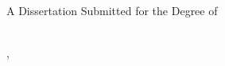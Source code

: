 \begin{titlepage}
    \begin{center}
        \begingroup
        \vspace*{2mm}
				\large \thesisType\\
        \vspace{2mm}
				\large \jpn{\thesisTypeJP}
        \endgroup

        \vfill

        \begingroup
				\Large \myTitle\\
        \vspace{2mm}
				\Large \jpn{(\myTitleJP)}
        \endgroup

        \vfill
        \vfill

        \begingroup
				\large A Dissertation Submitted for the Degree of {\myDegree}\\
				\large {\myTime}\\
        \vspace{2mm}
				\large {}
        \endgroup

        \vfill

        \begingroup
        \large \myDepartment, \myFaculty \\
        \myUni \\
        \vspace{2mm}
				\large \jpn{\myDepFacUniJP}
        \endgroup

        \vfill

        \begingroup
        \large \myName\\
        \vspace{2mm}
				\large \jpn{\myNameJP}
        \vspace{2mm}
        \endgroup


    \end{center}
\end{titlepage}
